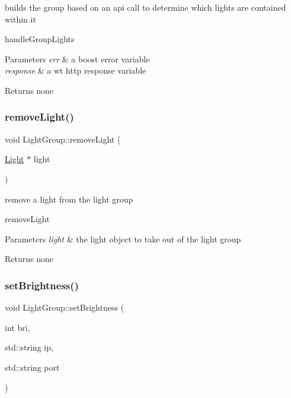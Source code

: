 builds the group based on an api call to determine which lights are contained within it 

handle\+Group\+Lights 
\begin{DoxyParams}{Parameters}
{\em err} & a boost error variable \\
\hline
{\em response} & a wt http response variable \\
\hline
\end{DoxyParams}
\begin{DoxyReturn}{Returns}
none 
\end{DoxyReturn}
\mbox{\label{class_light_group_a4c401d9a379641cfad1a5aa643a91e25}} 
\subsubsection{\texorpdfstring{remove\+Light()}{removeLight()}}
{\footnotesize\ttfamily void Light\+Group\+::remove\+Light (\begin{DoxyParamCaption}\item[{\hyperlink{class_light}{Light} $\ast$}]{light }\end{DoxyParamCaption})}



remove a light from the light group 

remove\+Light 
\begin{DoxyParams}{Parameters}
{\em light} & the light object to take out of the light group \\
\hline
\end{DoxyParams}
\begin{DoxyReturn}{Returns}
none 
\end{DoxyReturn}
\mbox{\label{class_light_group_a679f84c1478e032819f34977e16d531a}} 
\subsubsection{\texorpdfstring{set\+Brightness()}{setBrightness()}}
{\footnotesize\ttfamily void Light\+Group\+::set\+Brightness (\begin{DoxyParamCaption}\item[{int}]{bri,  }\item[{std\+::string}]{ip,  }\item[{std\+::string}]{port }\end{DoxyParamCaption})}



